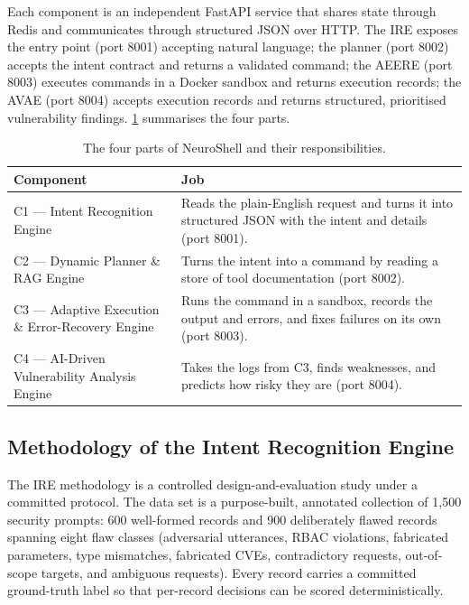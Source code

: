 Each component is an independent FastAPI service that shares state through
Redis and communicates through structured JSON over HTTP. The IRE exposes the
entry point (port 8001) accepting natural language; the planner (port 8002)
accepts the intent contract and returns a validated command; the AEERE (port
8003) executes commands in a Docker sandbox and returns execution records; the
AVAE (port 8004) accepts execution records and returns structured, prioritised
vulnerability findings. \cref{tab:chain} summarises the four parts.

\begin{table}[htbp]
  \centering
  \begin{tabular}{@{}p{}p{}@{}}
    \toprule
    \textbf{Component} & \textbf{Job}\\
    \midrule
    C1 --- Intent Recognition Engine & Reads the plain-English request and
    turns it into structured JSON with the intent and details (port 8001).\\
    C2 --- Dynamic Planner \& RAG Engine & Turns the intent into a command by
    reading a store of tool documentation (port 8002).\\
    C3 --- Adaptive Execution \& Error-Recovery Engine & Runs the command in a
    sandbox, records the output and errors, and fixes failures on its own (port 8003).\\
    C4 --- AI-Driven Vulnerability Analysis Engine & Takes the logs from C3,
    finds weaknesses, and predicts how risky they are (port 8004).\\
    \bottomrule
  \end{tabular}
  \caption{The four parts of NeuroShell and their responsibilities.}\label{tab:chain}
\end{table}

\subsection{Methodology of the Intent Recognition Engine}\label{sec:method-ire}

The IRE methodology is a controlled design-and-evaluation study under a
committed protocol. The data set is a purpose-built, annotated collection of
1,500 security prompts: 600 well-formed records and 900 deliberately flawed
records spanning eight flaw classes (adversarial utterances, RBAC violations,
fabricated parameters, type mismatches, fabricated CVEs, contradictory
requests, out-of-scope targets, and ambiguous requests). Every record carries a
committed ground-truth label so that per-record decisions can be scored
deterministically.


